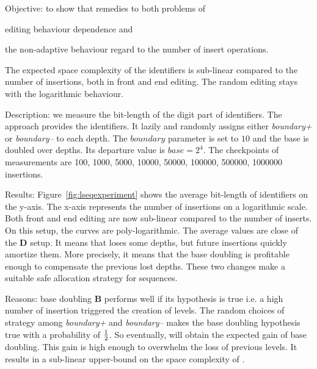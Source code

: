 \begin{asparadesc}
  \item[Objective:] to show that \NAME{} remedies to both problems of
  \begin{inparaenum}[(i)]
    \item editing behaviour dependence and
    \item the non-adaptive behaviour regard to the number of insert operations.
  \end{inparaenum}
  The expected space complexity of the identifiers is sub-linear compared to
  the number of insertions, both in front and end editing. The random editing
  stays with the logarithmic behaviour.

  \item[Description:] we measure the bit-length of the digit part of
    identifiers. The \NAME{} approach provides the identifiers. It lazily and
    randomly assigns either \emph{boundary+} or \emph{boundary--} to each
    depth. The $boundary$ parameter is set to $10$ and the base is doubled over
    depths. Its departure value is $base=2^{4}$. The checkpoints of
    measurements are 100, 1000, 5000, 10000, 50000, 100000, 500000, 1000000
    insertions.
  
  \item[Results:] Figure~\ref{fig:lseqexperiment} shows the average bit-length
    of \textbf{\NAME{}} identifiers on the y-axis. The x-axis represents the
    number of insertions on a logarithmic scale. Both front and end editing are
    now sub-linear compared to the number of inserts. On this setup, the curves
    are poly-logarithmic. The average values are close of the \textbf{D}
    setup. It means that \NAME{} loses some depths, but future insertions
    quickly amortize them. More precisely, it means that the base doubling is
    profitable enough to compensate the previous lost depths. These two changes
    make \NAME{} a suitable safe allocation strategy for sequences.

  \item[Reasons:] base doubling \textbf{B} performs well if its hypothesis is
    true i.e. a high number of insertion triggered the creation of levels. The
    random choices of strategy among \emph{boundary+} and \emph{boundary--}
    makes the base doubling hypothesis true with a probability of $1
    \over{2}$. So eventually, \textbf{\NAME{}} will obtain the expected gain of
    base doubling. This gain is high enough to overwhelm the loss of previous
    levels. It results in a sub-linear upper-bound on the space complexity of
    \textbf{\NAME{}}.
\end{asparadesc}

